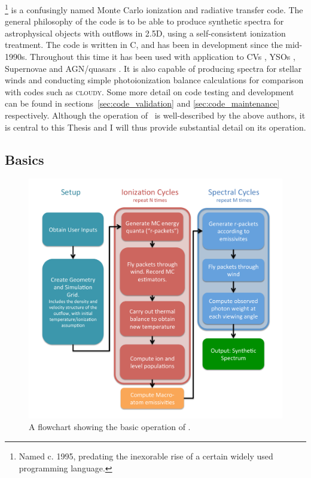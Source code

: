 \py\footnote{Named c. 1995, predating the inexorable rise of a certain widely used
programming language.} is a confusingly named 
Monte Carlo ionization and radiative transfer code. 
The general philosophy of the code is to be able to produce synthetic spectra
for astrophysical objects with outflows in 2.5D, using a self-consistent ionization 
treatment. The code is written in C, and has been in development since the mid-1990s.
Throughout this time it has been used with application to CVs \citep{LK02, M15},
YSOs \citep{simmacro2005}, Supernovae \citep{kerzendorfsim} and AGN/quasars 
\citep{higginbottom2013,H14,M16}. It is also capable of producing spectra 
for stellar winds and conducting simple photoionization balance calculations for
comparison with codes such as \textsc{cloudy}. Some more detail on code testing and 
development can be found in sections~\ref{sec:code_validation} and \ref{sec:code_maintenance}
respectively. Although the operation of \py\ is well-described by the above authors,
it is central to this Thesis and I will thus provide substantial detail on its operation. 

\subsection{Basics}

\begin{figure}
\centering
\includegraphics[width=1.0\textwidth]{figures/03-radtrans/flowchart.pdf}
\caption
{
A flowchart showing the basic operation of \py.
} 
\label{fig:flowchart}
\end{figure}

